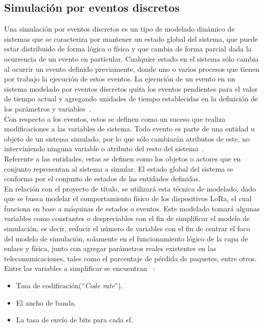 \begin{justify}
\section{Simulación por eventos discretos}
Una simulación por eventos discretos es un tipo de modelado dinámico de sistemas que se caracteriza por mantener un estado global del sistema, que puede estar distribuido de forma lógica o física y que cambia de forma parcial dada la ocurrencia de un evento en particular. Cualquier estado en el sistema sólo cambia al ocurrir un evento definido previamente, donde uno o varios procesos que tienen por trabajo la ejecución de estos eventos. La ejecución de un evento en un sistema modelado por eventos discretos quita los eventos pendientes para el valor de tiempo actual y agregando unidades de tiempo establecidas en la definición de los parámetros y variables~\cite{simubook}.\\
Con respecto a los eventos, estos se definen como un suceso que realiza modificaciones a las variables de sistema. Todo evento es parte de una entidad u objeto de un sistema simulado, por lo que sólo cambiarán atributos de este, no interviniendo ninguna variable o atributo del resto del sistema~\cite{simubook}.\\
Referente a las entidades, estas se definen como los objetos o actores que en conjunto representan al sistema a simular. El estado global del sistema se conforma por el conjunto de estados de las entidades definidas.\\
En relación con el proyecto de título, se utilizará esta técnica de modelado, dado que se busca modelar el comportamiento físico de los dispositivos LoRa, el cual funciona en base a máquinas de estados o eventos. Este modelado tomará algunas variables como constantes o despreciables con el fin de simplificar el modelo de simulación, es decir, reducir el número de variables con el fin de centrar el foco del modelo de simulación, solamente en el funcionamiento lógico de la capa de enlace y física, junto con agregar parámetros reales existentes en las telecomunicaciones, tales como el porcentaje de pérdida de paquetes, entre otros.\\
Entre las variables a simplificar se encuentran ~\cite{orange}:\\
\begin{itemize}
\item Tasa de codificación(``\textit{Code rate}'').
\item El ancho de banda.
\item La tasa de envío de bits para cada \gls{sf}.

\end{itemize}
\end{justify}
